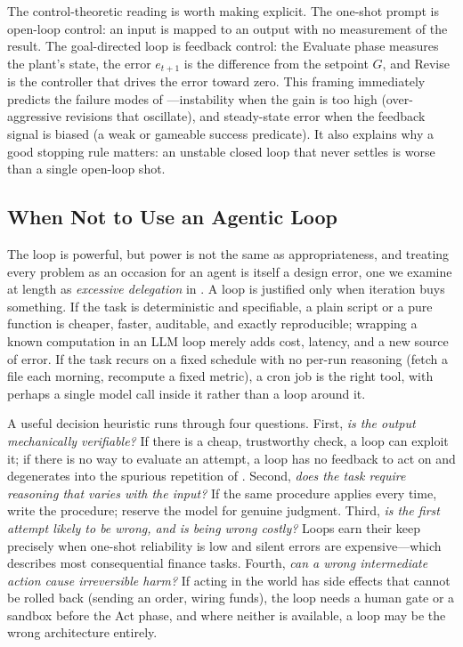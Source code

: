 \begin{deepdive}
The control-theoretic reading is worth making explicit. The one-shot prompt is open-loop control: an input is mapped to an output with no measurement of the result. The goal-directed loop is feedback control: the Evaluate phase measures the plant's state, the error $e_{t+1}$ is the difference from the setpoint $G$, and Revise is the controller that drives the error toward zero. This framing immediately predicts the failure modes of ---instability when the gain is too high (over-aggressive revisions that oscillate), and steady-state error when the feedback signal is biased (a weak or gameable success predicate). It also explains why a good stopping rule matters: an unstable closed loop that never settles is worse than a single open-loop shot.
\end{deepdive}

\subsection{When Not to Use an Agentic Loop}\label{subsec:when-not-to-loop}

The loop is powerful, but power is not the same as appropriateness, and treating every problem as an occasion for an agent is itself a design error, one we examine at length as \emph{excessive delegation} in . A loop is justified only when iteration buys something. If the task is deterministic and specifiable, a plain script or a pure function is cheaper, faster, auditable, and exactly reproducible; wrapping a known computation in an LLM loop merely adds cost, latency, and a new source of error. If the task recurs on a fixed schedule with no per-run reasoning (fetch a file each morning, recompute a fixed metric), a cron job is the right tool, with perhaps a single model call inside it rather than a loop around it.

A useful decision heuristic runs through four questions. First, \emph{is the output mechanically verifiable?} If there is a cheap, trustworthy check, a loop can exploit it; if there is no way to evaluate an attempt, a loop has no feedback to act on and degenerates into the spurious repetition of . Second, \emph{does the task require reasoning that varies with the input?} If the same procedure applies every time, write the procedure; reserve the model for genuine judgment. Third, \emph{is the first attempt likely to be wrong, and is being wrong costly?} Loops earn their keep precisely when one-shot reliability is low and silent errors are expensive---which describes most consequential finance tasks. Fourth, \emph{can a wrong intermediate action cause irreversible harm?} If acting in the world has side effects that cannot be rolled back (sending an order, wiring funds), the loop needs a human gate or a sandbox before the Act phase, and where neither is available, a loop may be the wrong architecture entirely.

